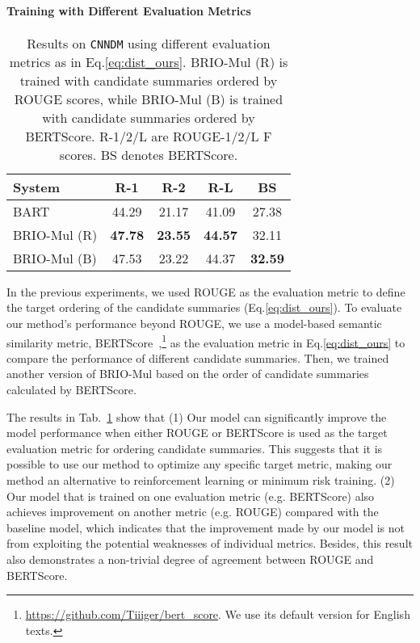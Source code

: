 \documentclass[11pt]{article}
\newcommand{\model}{BRIO\xspace}
\begin{document}
\paragraph{Training with Different Evaluation Metrics}

\begin{table}[t!]
\centering
\small
\begin{tabular}{lcccc}
\toprule
\textbf{System} & \textbf{R-1} & \textbf{R-2} & \textbf{R-L} & \textbf{BS} \\
\midrule
 BART & 44.29 & 21.17 & 41.09 & 27.38\\
 \model-Mul (R) & \textbf{47.78} & \textbf{23.55} & \textbf{44.57} & 32.11\\
 \model-Mul (B) & 47.53 & 23.22 & 44.37 & \textbf{32.59} \\
\bottomrule
\end{tabular}
\caption{\label{tab:bertscore} Results on \texttt{CNNDM} using different evaluation metrics as  in Eq.\ref{eq:dist_ours}.
\model-Mul (R) is trained with candidate summaries ordered by ROUGE scores, while \model-Mul (B) is trained with candidate summaries ordered by BERTScore.
R-1/2/L are ROUGE-1/2/L F scores.
BS denotes BERTScore.}
\end{table}


In the previous experiments, we used ROUGE as the evaluation metric to define the target ordering of the candidate summaries (Eq.\ref{eq:dist_ours}).
To evaluate our method's performance beyond ROUGE, we use a model-based semantic similarity metric, BERTScore~\citep{Zhang*2020BERTScore:},\footnote{\url{https://github.com/Tiiiger/bert_score}. We use its default version for English texts.} as the evaluation metric  in Eq.\ref{eq:dist_ours} to compare the performance of different candidate summaries.
Then, we trained another version of \model-Mul based on the order of candidate summaries calculated by BERTScore.

The results in Tab.~\ref{tab:bertscore} show that (1)
Our model can significantly improve the model performance when either ROUGE or BERTScore is used as the target evaluation metric for ordering candidate summaries. 
This suggests that it is possible to use our method to optimize any specific target metric, making our method an alternative to reinforcement learning or minimum risk training. 
(2) Our model that is trained on one evaluation metric (e.g. BERTScore) also achieves improvement on another metric (e.g. ROUGE) compared with the baseline model, which indicates that the improvement made by our model is not from exploiting the potential weaknesses of individual metrics.
Besides, this result also demonstrates a non-trivial degree of agreement between ROUGE and BERTScore.
\end{document}
